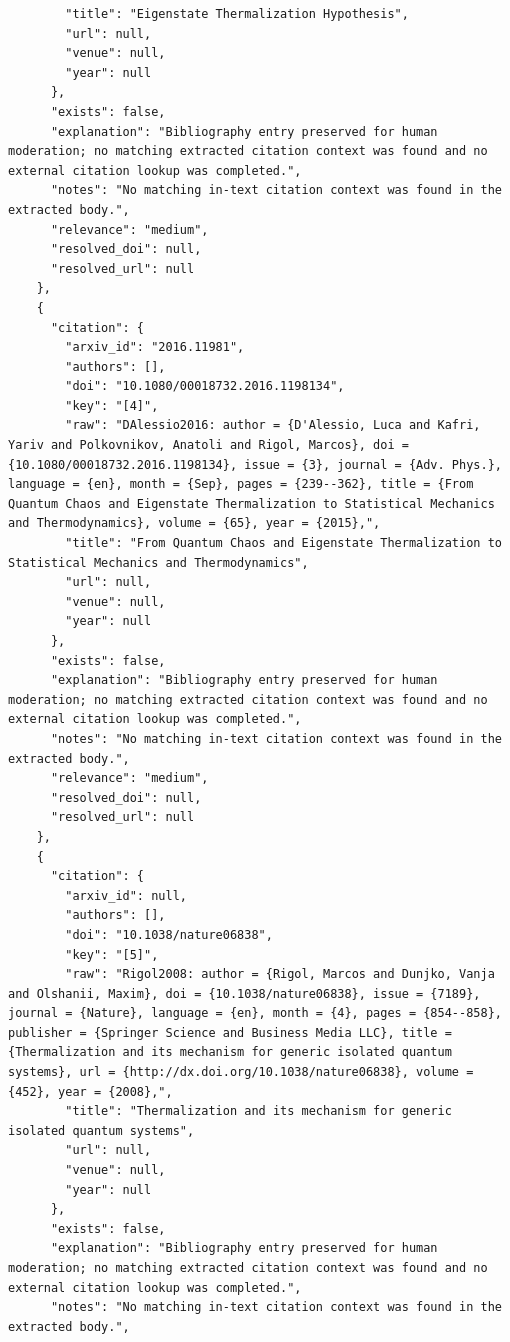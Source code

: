 \documentclass[11pt]{article}
\begin{document}
\begin{verbatim}
        "title": "Eigenstate Thermalization Hypothesis",
        "url": null,
        "venue": null,
        "year": null
      },
      "exists": false,
      "explanation": "Bibliography entry preserved for human moderation; no matching extracted citation context was found and no external citation lookup was completed.",
      "notes": "No matching in-text citation context was found in the extracted body.",
      "relevance": "medium",
      "resolved_doi": null,
      "resolved_url": null
    },
    {
      "citation": {
        "arxiv_id": "2016.11981",
        "authors": [],
        "doi": "10.1080/00018732.2016.1198134",
        "key": "[4]",
        "raw": "DAlessio2016: author = {D'Alessio, Luca and Kafri, Yariv and Polkovnikov, Anatoli and Rigol, Marcos}, doi = {10.1080/00018732.2016.1198134}, issue = {3}, journal = {Adv. Phys.}, language = {en}, month = {Sep}, pages = {239--362}, title = {From Quantum Chaos and Eigenstate Thermalization to Statistical Mechanics and Thermodynamics}, volume = {65}, year = {2015},",
        "title": "From Quantum Chaos and Eigenstate Thermalization to Statistical Mechanics and Thermodynamics",
        "url": null,
        "venue": null,
        "year": null
      },
      "exists": false,
      "explanation": "Bibliography entry preserved for human moderation; no matching extracted citation context was found and no external citation lookup was completed.",
      "notes": "No matching in-text citation context was found in the extracted body.",
      "relevance": "medium",
      "resolved_doi": null,
      "resolved_url": null
    },
    {
      "citation": {
        "arxiv_id": null,
        "authors": [],
        "doi": "10.1038/nature06838",
        "key": "[5]",
        "raw": "Rigol2008: author = {Rigol, Marcos and Dunjko, Vanja and Olshanii, Maxim}, doi = {10.1038/nature06838}, issue = {7189}, journal = {Nature}, language = {en}, month = {4}, pages = {854--858}, publisher = {Springer Science and Business Media LLC}, title = {Thermalization and its mechanism for generic isolated quantum systems}, url = {http://dx.doi.org/10.1038/nature06838}, volume = {452}, year = {2008},",
        "title": "Thermalization and its mechanism for generic isolated quantum systems",
        "url": null,
        "venue": null,
        "year": null
      },
      "exists": false,
      "explanation": "Bibliography entry preserved for human moderation; no matching extracted citation context was found and no external citation lookup was completed.",
      "notes": "No matching in-text citation context was found in the extracted body.",

\end{verbatim}
\end{document}
